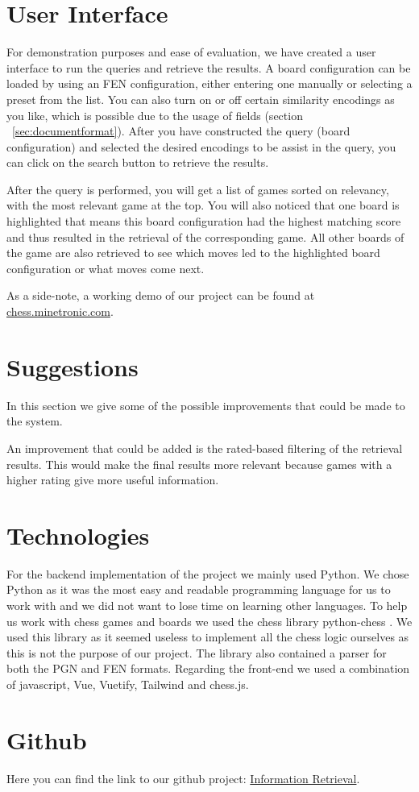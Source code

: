 \documentclass[11pt]{article}
\begin{document}
    \section{User Interface}

    For demonstration purposes and ease of evaluation, we have created a user interface to run the queries and retrieve the results. A board configuration can be loaded by using an FEN configuration, either entering one manually or selecting a preset from the list. You can also turn on or off certain similarity encodings as you like, which is possible due to the usage of fields (section ~\ref{sec:documentformat}). After you have constructed the query (board configuration) and selected the desired encodings to be assist in the query, you can click on the search button to retrieve the results.

    After the query is performed, you will get a list of games sorted on relevancy, with the most relevant game at the top. You will also noticed that one board is highlighted that means this board configuration had the highest matching score and thus resulted in the retrieval of the corresponding game. All other boards of the game are also retrieved to see which moves led to the highlighted board configuration or what moves come next.

    As a side-note, a working demo of our project can be found at \href{http://chess.minetronic.com}{chess.minetronic.com}.


    \section{Suggestions}

    In this section we give some of the possible improvements that could be made to the system.

    An improvement that could be added is the rated-based filtering of the retrieval results. This would make the final results more relevant because games with a higher rating give more useful information.


    \section{Technologies}

    For the backend implementation of the project we mainly used Python. We chose Python as it was the most easy and readable programming language for us to work with and we did not want to lose time on learning other languages. To help us work with chess games and boards we used the chess library python-chess \cite{python-chess}. We used this library as it seemed useless to implement all the chess logic ourselves as this is not the purpose of our project. The library also contained a parser for both the PGN and FEN formats. Regarding the front-end we used a combination of javascript, Vue, Vuetify, Tailwind and chess.js.

    \section{Github}

    Here you can find the link to our github project: \href{https://github.com/RobMandelings/InformationRetrieval.git}{Information Retrieval}.

    

\end{document}
